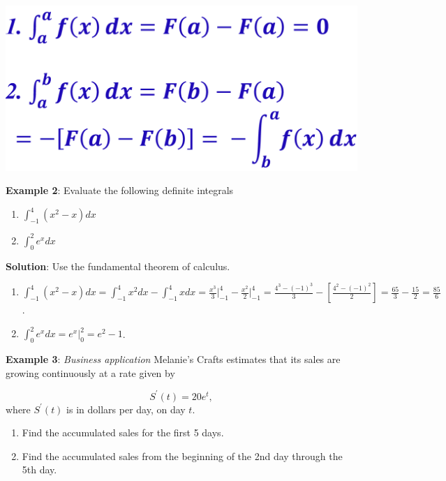 \documentclass[
]{book}
\begin{document}
\begin{center}\includegraphics[width=0.85\linewidth]{img12/ImportantResultsFundamentalTHM} \end{center}

\hfill\break

\textbf{Example 2}: Evaluate the following definite integrals

\begin{enumerate}
\def\labelenumi{\arabic{enumi}.}
\item
  \(\int_{-1}^4 (x^2-x)dx\)
\item
  \(\int_0^2 e^x dx\)
\end{enumerate}

\textbf{Solution}: Use the fundamental theorem of calculus.

\begin{enumerate}
\def\labelenumi{\arabic{enumi}.}
\item
  \(\int_{-1}^4 (x^2-x)dx = \int_{-1}^4 x^2 dx - \int_{-1}^4 x dx = \frac{x^3}{3}\Big|_{-1}^4 - \frac{x^2}{2}\Big|_{-1}^4=\frac{4^3 - (-1)^3}{3} - [\frac{4^2-(-1)^2}{2}] = \frac{65}{3} - \frac{15}{2} = \frac{85}{6}\).
\item
  \(\int_0^2 e^x dx = e^x \Big|_0^2 = e^2 - 1\).
\end{enumerate}

\textbf{Example 3}: \emph{Business application} Melanie's Crafts estimates that its sales are growing continuously at a rate given by

\[
S^\prime(t) = 20 e^t,
\]
where \(S^\prime(t)\) is in dollars per day, on day \(t\).

\begin{enumerate}
\def\labelenumi{\arabic{enumi}.}
\item
  Find the accumulated sales for the first 5 days.
\item
  Find the accumulated sales from the beginning of the 2nd day through the 5th day.
\end{enumerate}
\end{document}
